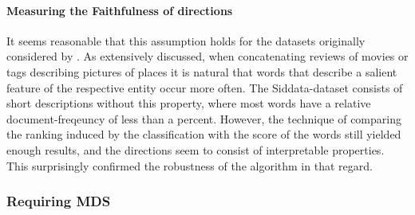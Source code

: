 \paragraph{Measuring the Faithfulness of directions}

It seems reasonable that this assumption holds for the datasets originally considered by \textcite{Derrac2015}. As extensively discussed, when concatenating reviews of movies or tags describing pictures of places it is natural that words that describe a salient feature of the respective entity occur more often. The Siddata-dataset consists of short descriptions without this property, where most words have a relative document-freqeuncy of less than a percent. However, the technique of comparing the ranking induced by the classification with the score of the words still yielded enough results, and the directions seem to consist of interpretable properties. This surprisingly confirmed the robustness of the algorithm in that regard.


\subsubsection{Requiring MDS}
\label{sec:discuss_mds}

